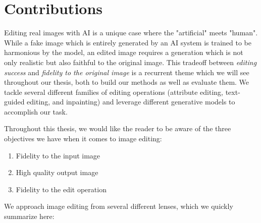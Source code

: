 \section{Contributions}

Editing real images with \ac{AI} is a unique case where the "artificial" meets "human". 
While a fake image 
which is entirely generated by an \ac{AI} system is trained to be harmonious by the model, an edited image
requires a generation which is not only realistic but also faithful to the original image. This 
tradeoff between \emph{editing success} and \emph{fidelity to the original image} is a recurrent theme which we will see throughout 
our thesis, both to build our methods as well as evaluate them. We tackle several different families of editing operations (attribute editing, 
text-guided editing, and inpainting) and leverage different generative models to accomplish our task. 

Throughout this thesis, we would like the reader to be aware of the three objectives we have when it comes to image editing:

\begin{enumerate}
    \item Fidelity to the input image
    \item High quality output image 
    \item Fidelity to the edit operation 
\end{enumerate}

We approach image editing from several different lenses, which we quickly summarize  here:

